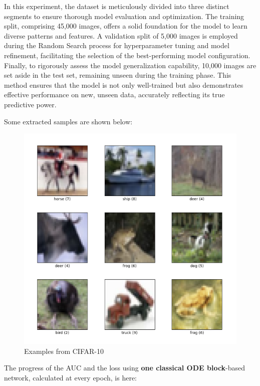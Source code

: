 \documentclass[12pt,a4paper]{report}
\begin{document}
In this experiment, the dataset is meticulously divided into three distinct segments to ensure thorough model evaluation and optimization. The training split, comprising 45,000 images, offers a solid foundation for the model to learn diverse patterns and features. A validation split of 5,000 images is employed during the Random Search process for hyperparameter tuning and model refinement, facilitating the selection of the best-performing model configuration. Finally, to rigorously assess the model generalization capability, 10,000 images are set aside in the test set, remaining unseen during the training phase. This method ensures that the model is not only well-trained but also demonstrates effective performance on new, unseen data, accurately reflecting its true predictive power.

Some extracted samples are shown below:

\begin{figure}[th]
  \centering
  \includegraphics[scale=0.75]{./pics/cifar10.png}
  \caption[Examples from CIFAR-10]{Examples from CIFAR-10\protect\footnotemark}
  \label{fig:p28}
\end{figure}

\clearpage

The progress of the AUC and the loss using \textbf{one classical ODE block}-based network, calculated at every epoch, is here:
\end{document}
